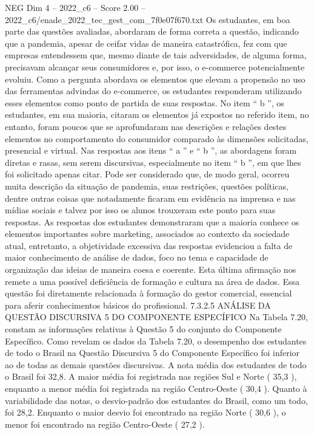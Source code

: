 \begin{textsample}{NEG Dim 4 – 2022\_c6 – Score 2.00 – 2022\_c6/enade\_2022\_tec\_gest\_com\_7f0e07f670.txt}
Os estudantes, em boa parte das questões avaliadas, abordaram de forma correta a questão, indicando que a pandemia, apesar de ceifar vidas de maneira catastrófica, fez com que empresas entendessem que, mesmo diante de tais adversidades, de alguma forma, precisavam alcançar seus consumidores e, por isso, o e-commerce potencialmente evoluiu.
Como a pergunta abordava os elementos que elevam a propensão no uso das ferramentas advindas do e-commerce, os estudantes responderam utilizando esses elementos como ponto de partida de suas respostas.
No item “ b ”, os estudantes, em sua maioria, citaram os elementos já expostos no referido item, no entanto, foram poucos que se aprofundaram nas descrições e relações destes elementos no comportamento do consumidor comparado às dimensões solicitadas, presencial e virtual.
Nas respostas aos itens “ a ” e “ b ”, as abordagens foram diretas e rasas, sem serem discursivas, especialmente no item “ b ”, em que lhes foi solicitado apenas citar.
Pode ser considerado que, de modo geral, ocorreu muita descrição da situação de pandemia, suas restrições, questões políticas, dentre outras coisas que notadamente ficaram em evidência na imprensa e nas mídias sociais e talvez por isso os alunos trouxeram este ponto para suas respostas.
As respostas dos estudantes demonstraram que a maioria conhece os elementos importantes sobre marketing, associados ao contexto da sociedade atual, entretanto, a objetividade excessiva das respostas evidenciou a falta de maior conhecimento de análise de dados, foco no tema e capacidade de organização das ideias de maneira coesa e coerente.
Esta última afirmação nos remete a uma possível deficiência de formação e cultura na área de dados.
Essa questão foi diretamente relacionada à formação do gestor comercial, essencial para aferir conhecimentos básicos do profissional. 7.3.2.5 ANÁLISE DA QUESTÃO DISCURSIVA 5 DO COMPONENTE ESPECÍFICO Na Tabela 7.20, constam as informações relativas à Questão 5 do conjunto do Componente Específico.
Como revelam os dados da Tabela 7.20, o desempenho dos estudantes de todo o Brasil na Questão Discursiva 5 do Componente Específico foi inferior ao de todas as demais questões discursivas.
A nota média dos estudantes de todo o Brasil foi 32,8.
A maior média foi registrada nas regiões Sul e Norte ( 35,3 ), enquanto a menor média foi registrada na região Centro-Oeste ( 30,4 ).
Quanto à variabilidade das notas, o desvio-padrão dos estudantes do Brasil, como um todo, foi 28,2.
Enquanto o maior desvio foi encontrado na região Norte ( 30,6 ), o menor foi encontrado na região Centro-Oeste ( 27,2 ).

\end{textsample}
